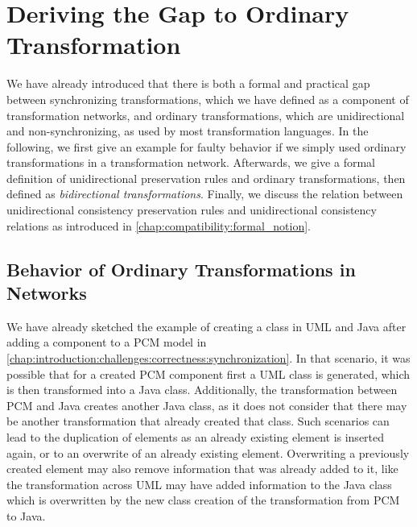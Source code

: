 \section{Deriving the Gap to Ordinary Transformation}

We have already introduced that there is both a formal and practical gap between synchronizing transformations, which we have defined as a component of transformation networks, and ordinary transformations, which are unidirectional and non-synchronizing, as used by most transformation languages.
In the following, we first give an example for faulty behavior if we simply used ordinary transformations in a transformation network.
Afterwards, we give a formal definition of unidirectional preservation rules and ordinary transformations, then defined as \emph{bidirectional transformations}.
Finally, we discuss the relation between unidirectional consistency preservation rules and unidirectional consistency relations as introduced in \autoref{chap:compatibility:formal_notion}.


\subsection{Behavior of Ordinary Transformations in Networks}

We have already sketched the example of creating a class in UML and Java after adding a component to a \gls{PCM} model in \autoref{chap:introduction:challenges:correctness:synchronization}.
In that scenario, it was possible that for a created \gls{PCM} component first a UML class is generated, which is then transformed into a Java class.
Additionally, the transformation between \gls{PCM} and Java creates another Java class, as it does not consider that there may be another transformation that already created that class.
Such scenarios can lead to the duplication of elements as an already existing element is inserted again, or to an overwrite of an already existing element.
Overwriting a previously created element may also remove information that was already added to it, like the transformation across UML may have added information to the Java class which is overwritten by the new class creation of the transformation from \gls{PCM} to Java.


